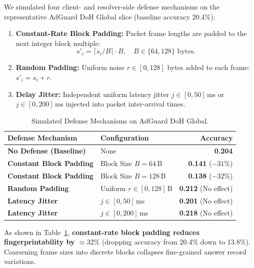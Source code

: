 \documentclass[conference,10pt]{IEEEtran}
\begin{document}
We simulated four client- and resolver-side defense mechanisms on the representative AdGuard DoH Global slice (baseline accuracy 20.4\%):
\begin{enumerate}
    \item \textbf{Constant-Rate Block Padding:} Packet frame lengths are padded to the next integer block multiple:
    \begin{equation}
    s'_i = \lceil s_i / B \rceil \cdot B, \quad B \in \{64, 128\}\text{ bytes}.
    \label{eq:padding}
    \end{equation}
    \item \textbf{Random Padding:} Uniform noise $r \in [0, 128]$ bytes added to each frame: $s'_i = s_i + r$.
    \item \textbf{Delay Jitter:} Independent uniform latency jitter $j \in [0, 50]$\,ms or $j \in [0, 200]$\,ms injected into packet inter-arrival times.
\end{enumerate}

\begin{table}[t]
\centering
\caption{Simulated Defense Mechanisms on AdGuard DoH Global.}
\label{tab:defenses}
\footnotesize
\setlength{\tabcolsep}{2.5pt}
\begin{tabular}{llr}
\toprule
\textbf{Defense Mechanism} & \textbf{Configuration} & \textbf{Accuracy} \\
\midrule
\textbf{No Defense (Baseline)}   & None                       & \textbf{0.204} \\
\textbf{Constant Block Padding}  & Block Size $B = 64$\,B     & \textbf{0.141} ($-31\%$) \\
\textbf{Constant Block Padding}  & Block Size $B = 128$\,B    & \textbf{0.138} ($-32\%$) \\
\textbf{Random Padding}          & Uniform $r \in [0, 128]$\,B& \textbf{0.212} (No effect) \\
\textbf{Latency Jitter}          & $j \in [0, 50]$\,ms        & \textbf{0.201} (No effect) \\
\textbf{Latency Jitter}          & $j \in [0, 200]$\,ms       & \textbf{0.218} (No effect) \\
\bottomrule
\end{tabular}
\end{table}

As shown in Table~\ref{tab:defenses}, \textbf{constant-rate block padding reduces fingerprintability by $\approx 32\%$} (dropping accuracy from 20.4\% down to 13.8\%). Coarsening frame sizes into discrete blocks collapses fine-grained answer record variations. 
\end{document}
